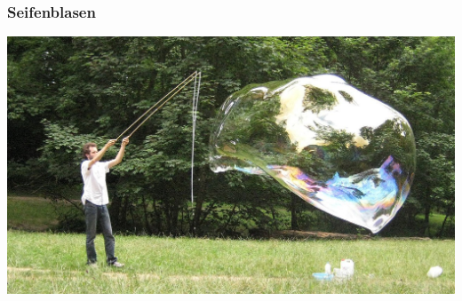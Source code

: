 %
%
%
\bgroup
\begin{frame}[t]
\setlength{\abovedisplayskip}{5pt}
\setlength{\belowdisplayskip}{5pt}
\frametitle{Seifenblasen}
\begin{center}
\includegraphics[width=\textwidth]{../slides/0/giant-soap-bubble-the-size-of-a-car.jpg}
\end{center}
\begin{columns}[t,onlytextwidth]
\begin{column}{0.48\textwidth}
\end{column}
\begin{column}{0.48\textwidth}
\end{column}
\end{columns}
\end{frame}
\egroup

